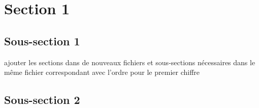 \section{Section 1}

\subsection{Sous-section 1}
ajouter les sections dans de nouveaux fichiers et sous-sections nécessaires dans le même
fichier correspondant avec l'ordre pour le premier chiffre

\subsection{Sous-section 2}